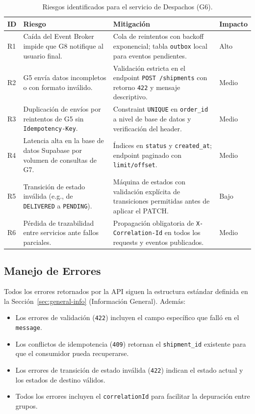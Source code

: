 \documentclass[11pt, a4paper]{article}
\begin{document}
\begin{table}[!ht]
\centering
\renewcommand{\arraystretch}{1.4}
\begin{tabularx}{\textwidth}{l X X l}
  \toprule
  \textbf{ID} & \textbf{Riesgo} & \textbf{Mitigación} & \textbf{Impacto} \\
  \midrule
  R1 & Caída del Event Broker impide que G8 notifique al usuario final. & Cola de reintentos con backoff exponencial; tabla \texttt{outbox} local para eventos pendientes. & Alto \\
  R2 & G5 envía datos incompletos o con formato inválido. & Validación estricta en el endpoint \texttt{POST /shipments} con retorno \texttt{422} y mensaje descriptivo. & Medio \\
  R3 & Duplicación de envíos por reintentos de G5 sin \texttt{Idempotency-Key}. & Constraint \texttt{UNIQUE} en \texttt{order\_id} a nivel de base de datos y verificación del header. & Medio \\
  R4 & Latencia alta en la base de datos Supabase por volumen de consultas de G7. & Índices en \texttt{status} y \texttt{created\_at}; endpoint paginado con \texttt{limit/offset}. & Medio \\
  R5 & Transición de estado inválida (e.g., de \texttt{DELIVERED} a \texttt{PENDING}). & Máquina de estados con validación explícita de transiciones permitidas antes de aplicar el PATCH. & Bajo \\
  R6 & Pérdida de trazabilidad entre servicios ante fallos parciales. & Propagación obligatoria de \texttt{X-Correlation-Id} en todos los requests y eventos publicados. & Medio \\
  \bottomrule
\end{tabularx}
\caption{Riesgos identificados para el servicio de Despachos (G6).}
\end{table}

\subsection{Manejo de Errores}

Todos los errores retornados por la API siguen la estructura estándar definida en la Sección~\ref{sec:general-info} (Información General). Además:

\begin{itemize}[noitemsep]
  \item Los errores de validación (\texttt{422}) incluyen el campo específico que falló en el \texttt{message}.
  \item Los conflictos de idempotencia (\texttt{409}) retornan el \texttt{shipment\_id} existente para que el consumidor pueda recuperarse.
  \item Los errores de transición de estado inválida (\texttt{422}) indican el estado actual y los estados de destino válidos.
  \item Todos los errores incluyen el \texttt{correlationId} para facilitar la depuración entre grupos.
\end{itemize}
\end{document}
